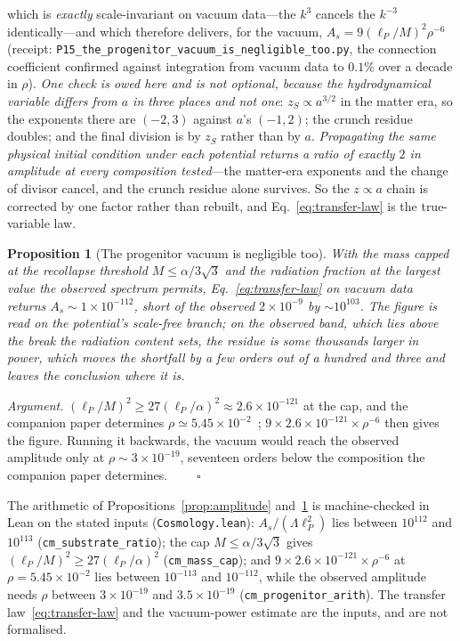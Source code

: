 \documentclass[11pt,a4paper]{article}
\theoremstyle{plain}
\newtheorem{proposition}{Proposition}
\theoremstyle{definition}
\theoremstyle{remark}
\begin{document}
which is \emph{exactly} scale-invariant on vacuum data---the $k^3$ cancels the $k^{-3}$ identically---and which therefore delivers, for the vacuum, $A_s=9(\ell_P/M)^2\rho^{-6}$ (receipt: \texttt{P15\_the\_progenitor\_vacuum\_is\_negligible\_too.py}, the connection coefficient confirmed against integration from vacuum data to $0.1\%$ over a decade in $\rho$). \emph{One check is owed here and is not optional, because the hydrodynamical variable differs from $a$ in three places and not one}: $z_S\propto a^{3/2}$ in the matter era, so the exponents there are $(-2,3)$ against $a$'s $(-1,2)$; the crunch residue doubles; and the final division is by $z_S$ rather than by $a$. \emph{Propagating the same physical initial condition under each potential returns a ratio of exactly $2$ in amplitude at every composition tested}---the matter-era exponents and the change of divisor cancel, and the crunch residue alone survives. So the $z\propto a$ chain is corrected by one factor rather than rebuilt, and Eq.~\eqref{eq:transfer-law} is the true-variable law.

\begin{proposition}[The progenitor vacuum is negligible too]\label{prop:progenitor-amplitude}
With the mass capped at the recollapse threshold $M\le\alpha/3\sqrt3$ and the radiation fraction at the largest value the observed spectrum permits, Eq.~\eqref{eq:transfer-law} on vacuum data returns $A_s\sim1\times10^{-112}$, short of the observed $2\times10^{-9}$ by $\sim10^{103}$. \emph{The figure is read on the potential's scale-free branch}; on the observed band, which lies above
the break the radiation content sets, the residue is some thousands larger in power, which moves the
shortfall by a few orders out of a hundred and three and leaves the conclusion where it is.
\end{proposition}

\noindent\emph{Argument.} $(\ell_P/M)^2\ge27(\ell_P/\alpha)^2\approx2.6\times10^{-121}$ at the cap, and the companion paper determines $\rho\simeq5.45\times10^{-2}$~\cite{JanzenCosmogenesis}; $9\times2.6\times10^{-121}\times\rho^{-6}$ then gives the figure. Running it backwards, the vacuum would reach the observed amplitude only at $\rho\sim3\times10^{-19}$, seventeen orders below the composition the companion paper determines. $\qquad\square$

The arithmetic of Propositions~\ref{prop:amplitude} and~\ref{prop:progenitor-amplitude} is machine-checked in Lean on the stated inputs (\texttt{Cosmology.lean}): $A_s/(\Lambda\ell_P^{2})$ lies between $10^{112}$ and $10^{113}$ (\texttt{cm\_substrate\_ratio}); the cap $M\le\alpha/3\sqrt3$ gives $(\ell_P/M)^{2}\ge27(\ell_P/\alpha)^{2}$ (\texttt{cm\_mass\_cap}); and $9\times2.6\times10^{-121}\times\rho^{-6}$ at $\rho=5.45\times10^{-2}$ lies between $10^{-113}$ and $10^{-112}$, while the observed amplitude needs $\rho$ between $3\times10^{-19}$ and $3.5\times10^{-19}$ (\texttt{cm\_progenitor\_arith}). The transfer law~\eqref{eq:transfer-law} and the vacuum-power estimate are the inputs, and are not formalised.
\end{document}
